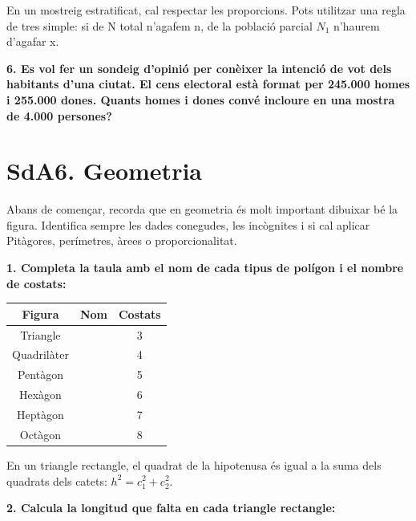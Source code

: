 \documentclass[12pt,a4paper]{article}
\begin{document}
\begin{capsula}
En un mostreig estratificat, cal respectar les proporcions. Pots utilitzar una regla de tres simple: si de N total n’agafem n, de la població parcial $N_1$ n’haurem d’agafar x.
\end{capsula}

\textbf{6. Es vol fer un sondeig d’opinió per conèixer la intenció de vot dels habitants d’una ciutat. El cens electoral està format per 245.000 homes i 255.000 dones. Quants homes i dones convé incloure en una mostra de 4.000 persones?}

\vspace{2.5cm}

\section*{SdA6. Geometria}

\begin{capsula}
Abans de començar, recorda que en geometria és molt important dibuixar bé la figura. Identifica sempre les dades conegudes, les incògnites i si cal aplicar Pitàgores, perímetres, àrees o proporcionalitat.
\end{capsula}

\textbf{1. Completa la taula amb el nom de cada tipus de polígon i el nombre de costats:}

\begin{center}
\renewcommand{\arraystretch}{1.4}
\begin{tabular}{|c|c|c|}
\hline
\rowcolor{cyan!20}
\textbf{Figura} & \textbf{Nom} & \textbf{Costats} \\ \hline
Triangle &  & 3 \\ \hline
Quadrilàter &  & 4 \\ \hline
Pentàgon &  & 5 \\ \hline
Hexàgon &  & 6 \\ \hline
Heptàgon &  & 7 \\ \hline
Octàgon &  & 8 \\ \hline
\end{tabular}
\end{center}

\begin{capsula}
En un triangle rectangle, el quadrat de la hipotenusa és igual a la suma dels quadrats dels catets: $h^2=c_1^2+c_2^2$.
\end{capsula}

\textbf{2. Calcula la longitud que falta en cada triangle rectangle:}
\end{document}
